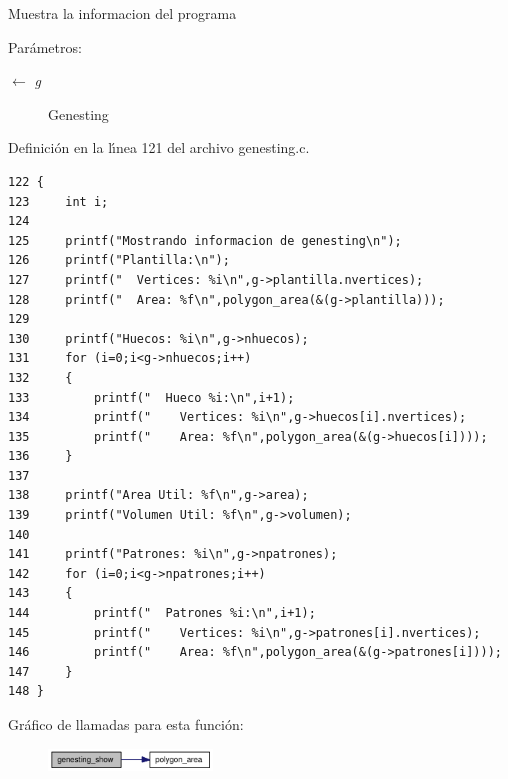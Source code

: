 Muestra la informacion del programa \begin{Desc}
\item[Par\'{a}metros:]
\begin{description}
\item[\mbox{$\leftarrow$} {\em g}]Genesting \end{description}
\end{Desc}


Definici\'{o}n en la l\'{\i}nea 121 del archivo genesting.c.

\begin{Code}\begin{verbatim}122 {
123     int i;
124 
125     printf("Mostrando informacion de genesting\n");
126     printf("Plantilla:\n");
127     printf("  Vertices: %i\n",g->plantilla.nvertices);
128     printf("  Area: %f\n",polygon_area(&(g->plantilla)));
129 
130     printf("Huecos: %i\n",g->nhuecos);
131     for (i=0;i<g->nhuecos;i++)
132     {
133         printf("  Hueco %i:\n",i+1);
134         printf("    Vertices: %i\n",g->huecos[i].nvertices);
135         printf("    Area: %f\n",polygon_area(&(g->huecos[i])));
136     }
137 
138     printf("Area Util: %f\n",g->area);
139     printf("Volumen Util: %f\n",g->volumen);
140 
141     printf("Patrones: %i\n",g->npatrones);
142     for (i=0;i<g->npatrones;i++)
143     {
144         printf("  Patrones %i:\n",i+1);
145         printf("    Vertices: %i\n",g->patrones[i].nvertices);
146         printf("    Area: %f\n",polygon_area(&(g->patrones[i])));
147     }
148 }
\end{verbatim}\end{Code}




Gr\'{a}fico de llamadas para esta funci\'{o}n:\begin{figure}[H]
\begin{center}
\leavevmode
\includegraphics[width=124pt]{group__genetic_g3f63f4034274d731cb3fdf3200c64d41_g3f63f4034274d731cb3fdf3200c64d41_cgraph}
\end{center}
\end{figure}


